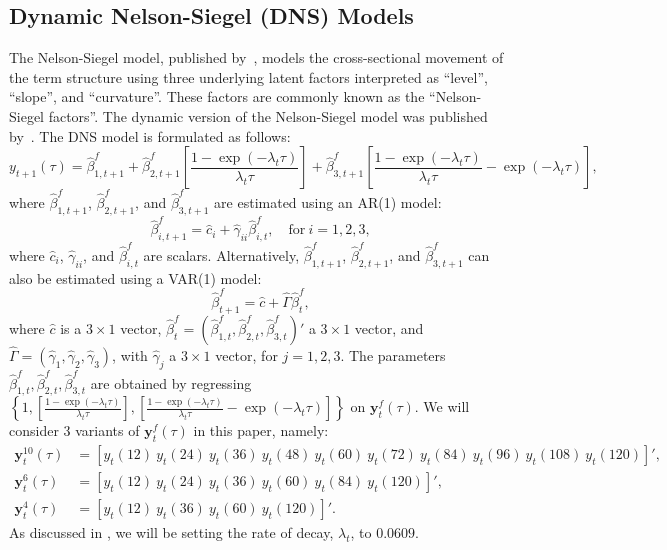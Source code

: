 \subsection{Dynamic Nelson-Siegel (DNS) Models}
\label{sec:dns}
The Nelson-Siegel model, published by~\textcite{Nelson1987}, models the cross-sectional movement of the term structure using three underlying latent factors interpreted as \enquote{level}, \enquote{slope}, and \enquote{curvature}. These factors are commonly known as the \enquote{Nelson-Siegel factors}. The dynamic version of the Nelson-Siegel model was published by~\textcite[hereafter DNS]{Diebold2006}. The DNS model is formulated as follows:
\begin{equation}
	y_{t+1}(\tau) = \hat{\beta}_{1,t+1}^{f} + \hat{\beta}_{2,t+1}^{f} \left[\frac{1-\exp(-\lambda_t \tau)}{\lambda_t \tau}\right] + \hat{\beta}_{3,t+1}^{f} \left[\frac{1-\exp(-\lambda_t \tau)}{\lambda_t \tau} - \exp(-\lambda_t \tau)\right],
\end{equation}
where $\hat{\beta}_{1,t+1}^{f}$, $\hat{\beta}_{2,t+1}^{f}$, and $\hat{\beta}_{3,t+1}^{f}$ are estimated using an AR(1) model:
\begin{equation}
\label{eq:dnsar}
	\hat{\beta}_{i,t+1}^{f} = \hat{c}_i + \hat{\gamma}_{ii} \hat{\beta}_{i,t}^f, \quad \text{for}~i = 1,2,3,
\end{equation}
where $\hat{c}_i$, $\hat{\gamma}_{ii}$, and $\hat{\beta}_{i,t}^f$ are scalars. Alternatively, $\hat{\beta}_{1,t+1}^{f}$, $\hat{\beta}_{2,t+1}^{f}$, and $\hat{\beta}_{3,t+1}^{f}$ can also be estimated using a VAR(1) model:
\begin{equation}
\label{eq:dnsvar}
	\hat{\beta}_{t+1}^{f} = \hat{c} + \hat{\Gamma} \hat{\beta}_t^f,
\end{equation}
where $\hat{c}$ is a $3 \times 1$ vector, $\hat{\beta}_t^f = \left(\hat{\beta}_{1,t}^f, \hat{\beta}_{2,t}^f, \hat{\beta}_{3,t}^f\right)'$ a $3 \times 1$ vector, and $\hat{\Gamma} = \left(\hat{\gamma}_1, \hat{\gamma}_2, \hat{\gamma}_3 \right)$, with $\hat{\gamma}_j$ a $3 \times 1$ vector, for $j = 1,2,3$. The parameters $\hat{\beta}_{1,t}^f, \hat{\beta}_{2,t}^f, \hat{\beta}_{3,t}^f$ are obtained by regressing $\left\{1, \left[\frac{1-\exp(-\lambda_t \tau)}{\lambda_t \tau}\right], \left[\frac{1-\exp(-\lambda_t \tau)}{\lambda_t \tau} - \exp(-\lambda_t \tau)\right] \right\}$ on $\mathbf{y}_t^f(\tau)$. We will consider 3 variants of $\mathbf{y}_t^f(\tau)$ in this paper, namely:
\begin{align*}
	\mathbf{y}_t^{10}(\tau) &= \left[y_t(12)~y_t(24)~y_t(36)~y_t(48)~y_t(60)~y_t(72)~y_t(84)~y_t(96)~y_t(108)~y_t(120) \right]', \\
	\mathbf{y}_t^6(\tau) &= \left[y_t(12)~y_t(24)~y_t(36)~y_t(60)~y_t(84)~y_t(120) \right]', \\
	\mathbf{y}_t^4(\tau) &= \left[y_t(12)~y_t(36)~y_t(60)~y_t(120) \right]'.
\end{align*}
As discussed in \textcite{Diebold2006}, we will be setting the rate of decay, $\lambda_t$, to $0.0609$.

